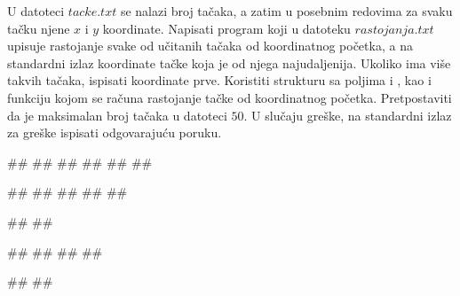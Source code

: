 \begin{Exercise}[label=p3_07] 
 U datoteci $tacke.txt$ se nalazi broj tačaka, a zatim u posebnim redovima  
 za svaku tačku njene $x$ i $y$ koordinate. 
 Napisati program koji u datoteku $rastojanja.txt$ upisuje rastojanje svake 
 od učitanih tačaka od koordinatnog početka, 
 a na standardni izlaz koordinate tačke koja je od njega najudaljenija. Ukoliko ima više takvih tačaka, ispisati koordinate prve.
 Koristiti strukturu  sa poljima  i , 
 kao i funkciju kojom se računa rastojanje tačke od koordinatnog početka. 
 Pretpostaviti da je maksimalan broj tačaka u datoteci $50$.
 U slučaju greške, na standardni izlaz za greške ispisati odgovarajuću poruku.

\begin{miditest}
\begin{upotreba}{1}
##
##
##
##
##
##

##
##
##
##
##

#\naslovIzlaz#
##
\end{upotreba}
\end{miditest}
\begin{miditest}
\begin{upotreba}{2}
##
##
##
##

#\naslovIzlazZaGresku#
##
\end{upotreba}
\end{miditest}
\end{Exercise}
\begin{Answer}[ref=p3_07]
\end{Answer}


